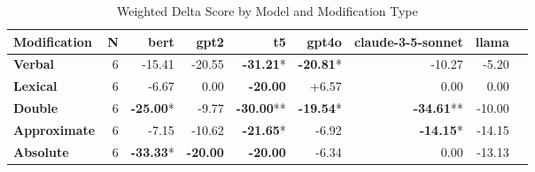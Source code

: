 \begin{table}[h]
\centering
\begin{tabular}{lrrrrrrrr}
\hline
Modification & N & \textbf{bert} & \textbf{gpt2} & \textbf{t5} & \textbf{gpt4o} & \textbf{claude-3-5-sonnet} & \textbf{llama} \\
\hline
\textbf{Verbal} & 6 & \cellcolor{red!30} -15.41 & \cellcolor{red!30} -20.55 & \cellcolor{red!30} \textbf{-31.21}* & \cellcolor{red!30} \textbf{-20.81}* & \cellcolor{red!30} -10.27 & \cellcolor{red!15} -5.20 \\
\hline
\textbf{Lexical} & 6 & \cellcolor{red!20} -6.67 & \cellcolor{red!0} 0.00 & \cellcolor{red!30} \textbf{-20.00} & \cellcolor{green!19} +6.57 & \cellcolor{red!0} 0.00 & \cellcolor{red!0} 0.00 \\
\hline
\textbf{Double} & 6 & \cellcolor{red!30} \textbf{-25.00}* & \cellcolor{red!29} -9.77 & \cellcolor{red!30} \textbf{-30.00}** & \cellcolor{red!30} \textbf{-19.54}* & \cellcolor{red!30} \textbf{-34.61}** & \cellcolor{red!30} -10.00 \\
\hline
\textbf{Approximate} & 6 & \cellcolor{red!21} -7.15 & \cellcolor{red!30} -10.62 & \cellcolor{red!30} \textbf{-21.65}* & \cellcolor{red!20} -6.92 & \cellcolor{red!30} \textbf{-14.15}* & \cellcolor{red!30} -14.15 \\
\textbf{Absolute} & 6 & \cellcolor{red!30} \textbf{-33.33}* & \cellcolor{red!30} \textbf{-20.00} & \cellcolor{red!30} \textbf{-20.00} & \cellcolor{red!19} -6.34 & \cellcolor{red!0} 0.00 & \cellcolor{red!30} -13.13 \\
\hline
\end{tabular}
\caption{Weighted Delta Score by Model and Modification Type}
\label{tab:ner_results}
\end{table}